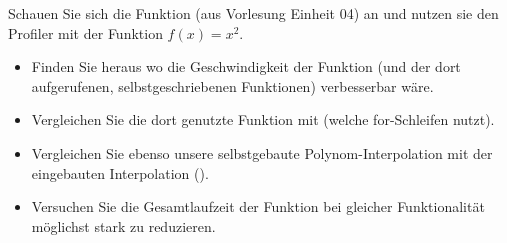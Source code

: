 \begin{aufg}[0]
Schauen Sie sich die Funktion  (aus Vorlesung Einheit 04) an und nutzen sie den Profiler mit der Funktion $f(x) = x^2$.

\begin{itemize}
 \item Finden Sie heraus  wo die Geschwindigkeit der Funktion (und der dort aufgerufenen, selbstgeschriebenen Funktionen) verbesserbar wäre. 
\item Vergleichen Sie die dort genutzte Funktion  mit  
(welche for-Schleifen nutzt). 
\item Vergleichen Sie ebenso unsere selbstgebaute Polynom-Interpolation mit der eingebauten Interpolation ().
\item Versuchen Sie die Gesamtlaufzeit der Funktion bei gleicher Funktionalität möglichst stark zu reduzieren.
\end{itemize}

\end{aufg}

